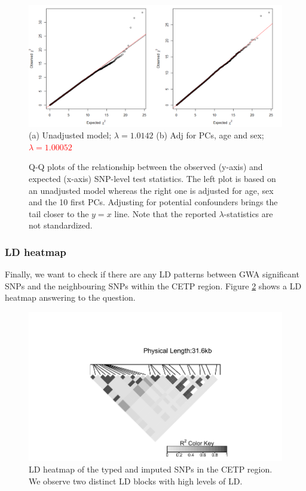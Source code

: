 \documentclass[a4paper, 12pt]{article}
\begin{document}
\begin{figure}[!ht]
\centering
\includegraphics[width=\textwidth]{../Plots/QQplot.png}
(a) Unadjusted model; $\lambda = 1.0142$ \hspace{1.6cm}
(b) Adj for PCs, age and sex; \textcolor{red}{$\lambda = 1.00052$}
\caption{Q-Q plots of the relationship between the observed (y-axis) and expected (x-axis) SNP-level test statistics. The left plot is based on an unadjusted model whereas the right one is adjusted for age, sex and the 10 first PCs. Adjusting for potential confounders brings the tail closer to the $y=x$ line. Note that the reported $\lambda$-statistics are not standardized.}
\label{fig:QQplot}
\end{figure}

\subsubsection*{LD heatmap}

Finally, we want to check if there are any LD patterns between GWA significant SNPs and the neighbouring SNPs within the CETP region. Figure \ref{fig:LDheatmap} shows a LD heatmap answering to the question. 

\begin{figure}[!ht]
\centering
\includegraphics[scale=1]{../Plots/LDheatmap.pdf}
\caption{LD heatmap of the typed and imputed SNPs in the CETP region. We observe two distinct LD blocks with high levels of LD.}
\label{fig:LDheatmap}
\end{figure}
\end{document}
